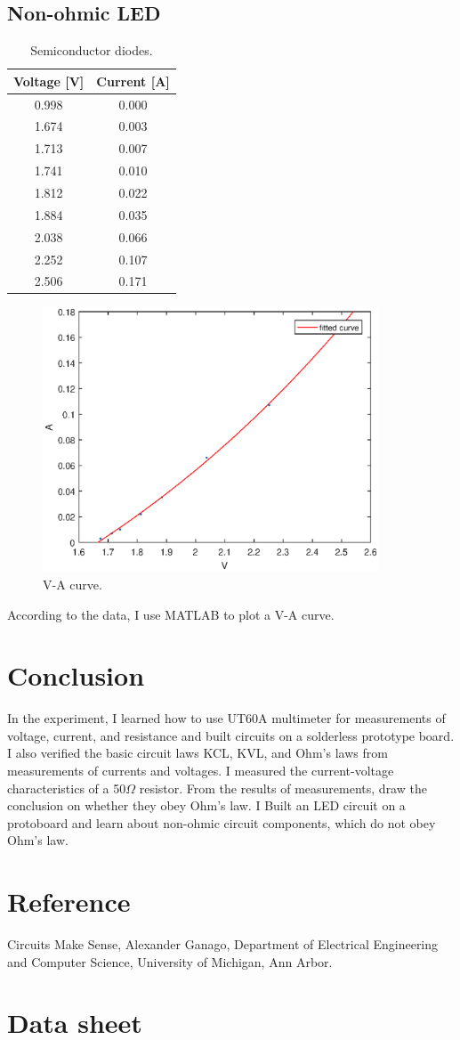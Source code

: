 \documentclass{article}
\begin{document}
\subsection{Non-ohmic LED}
\begin{table}[!h]
\begin{center}
\begin{tabular}{|c|c|}
\hline
Voltage [V]	& Current [A]\\
\hline
0.998 & 0.000\\
1.674 & 0.003\\
1.713 & 0.007\\
1.741 & 0.010\\
1.812 & 0.022\\
1.884 & 0.035\\
2.038 & 0.066\\
2.252 & 0.107\\
2.506 & 0.171\\
\hline
\end{tabular}
\caption{Semiconductor diodes.}
\label{tab-3}
\end{center}
\end{table}
\begin{figure}[!h]
	\centering
	\includegraphics[width=10cm]{lab1.eps}
	\caption{V-A curve.
	\label{fig-1}}
\end{figure}
According to the data, I use MATLAB to plot a V-A curve.


\section{Conclusion}
In the experiment, I learned how to use UT60A multimeter for measurements of voltage, current, and resistance and built circuits on a solderless prototype board. I also verified the basic circuit laws KCL, KVL, and Ohm’s laws from measurements of currents and voltages. I measured the current-voltage characteristics of a 50$\Omega$ resistor. From the results of measurements, draw the conclusion on whether they obey Ohm’s law. I Built an LED circuit on a protoboard and learn about non-ohmic circuit components, which do not obey Ohm’s law.

\section{Reference}
Circuits Make Sense, Alexander Ganago, Department of Electrical Engineering and Computer Science, University of Michigan, Ann Arbor.

\section{Data sheet}
\end{document}
